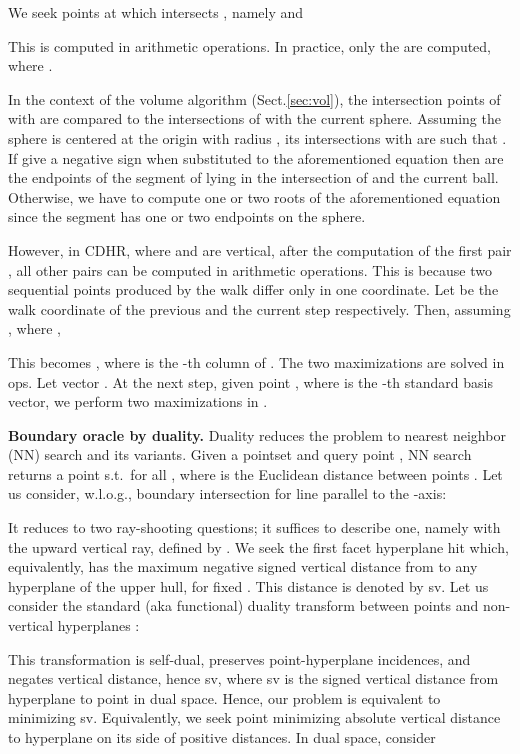 \documentclass[11pt,a4paper]{article}
\begin{document}
We seek points  at which  intersects ,
namely   and 

This is computed in  arithmetic operations.  
In practice, only the  are computed, where
.

In the context of the volume algorithm (Sect.\ref{sec:vol}), 
the intersection points of  with  are compared to the intersections of  with the current sphere.
Assuming the sphere is centered at the origin with radius ,
its intersections with 
are  such that 
. 
If  give a negative sign when substituted to
the aforementioned equation 
then  are the
endpoints of the segment of  lying in the intersection of
 and the current ball.
Otherwise, we have to compute one or two roots of
the aforementioned equation 
since the segment has one or two endpoints on the sphere.

However, in CDHR, where  and  are vertical,  
after the computation of the first pair , all
other pairs can be computed in  arithmetic operations.
This is because two sequential points produced by the walk
differ only in one coordinate.
Let  be the walk coordinate of the previous and the current
step respectively.
Then, assuming , where ,

This becomes ,
where  is the -th column of .
The two maximizations are solved in  ops.
Let vector .
At the next step, given point , where 
is the -th standard basis vector, we perform two maximizations
 in .

\textbf{Boundary oracle by duality.}\label{subsec:duality}
Duality reduces the problem to nearest neighbor (NN) search and its variants. 
Given a pointset  and query point , NN search returns a point  
s.t.\  for all , where 
is the Euclidean distance between points .
Let us consider, w.l.o.g., boundary intersection for line 
parallel to the -axis:

It reduces to two ray-shooting questions; it suffices to describe one,
namely with the upward vertical ray, defined by .  We seek the first facet hyperplane hit which, equivalently, has the
maximum negative signed vertical distance from  to any hyperplane 
of the upper hull, for fixed .
This distance is denoted by sv.
Let us consider the standard (aka functional) duality transform
between points  and non-vertical hyperplanes :
\begin{small}

\end{small}
This transformation is self-dual, preserves point-hyperplane incidences,
and negates vertical
distance, hence sv, where sv
is the signed vertical distance from hyperplane  to point 
in dual space.
Hence, our problem is equivalent to
minimizing sv.
Equivalently, we seek point  minimizing absolute vertical distance 
to hyperplane  on its side of positive distances.
In dual space, consider 
\end{document}
